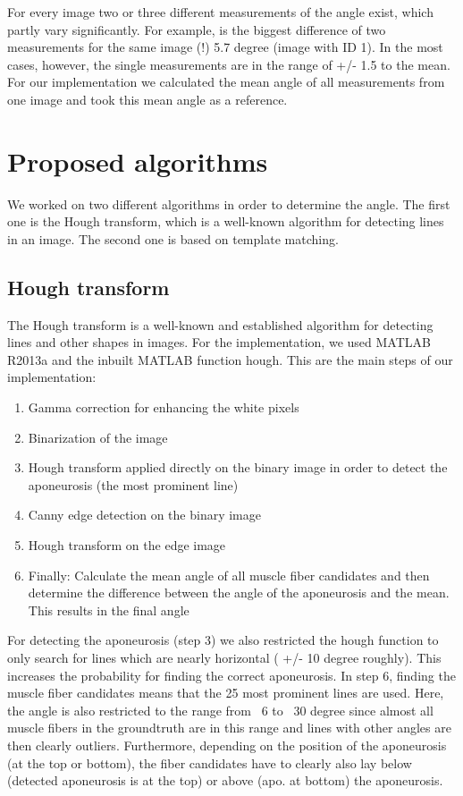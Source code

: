 \documentclass[10pt,twocolumn,letterpaper]{article}
\begin{document}
For every image two or three different measurements of the angle exist, which partly vary significantly. For example, is the biggest difference of two measurements for the same image (!) 5.7 degree (image with ID 1). In the most cases, however, the single measurements are in the range of +/- 1.5 to the mean.
For our implementation we calculated the mean angle of all measurements from one image and took this mean angle as a reference.

\section{Proposed algorithms}
We worked on two different algorithms in order to determine the angle. The first one is the Hough transform, which is a well-known algorithm for detecting lines in an image. The second one is based on template matching.

\subsection{Hough transform}
\label{sec:hough}
The Hough transform is a well-known and established algorithm for detecting lines and other shapes in images. For the implementation, we used MATLAB R2013a and the inbuilt MATLAB function hough.
This are the main steps of our implementation:

\begin{enumerate}
     \item Gamma correction for enhancing the white pixels
     \item Binarization of the image
     \item Hough transform applied directly on the binary image in order to detect the aponeurosis (the most prominent line)
     \item Canny edge detection on the binary image
     \item Hough transform on the edge image
     \item Finally: Calculate the mean angle of all muscle fiber candidates and then determine the difference between the angle of the aponeurosis and the mean. This results in the final angle
\end{enumerate}

For detecting the aponeurosis (step 3) we also restricted the hough function to only search for lines which are nearly horizontal ( +/- 10 degree roughly). This increases the probability for finding the correct aponeurosis. In step 6, finding the muscle fiber candidates means that the 25 most prominent lines are used. Here, the angle is also restricted to the range from ~6 to ~30 degree since almost all muscle fibers in the groundtruth are in this range and lines with other angles are then clearly outliers. Furthermore, depending on the position of the aponeurosis (at the top or bottom), the fiber candidates have to clearly also lay below (detected aponeurosis is at the top) or above (apo. at bottom) the aponeurosis.
\end{document}

